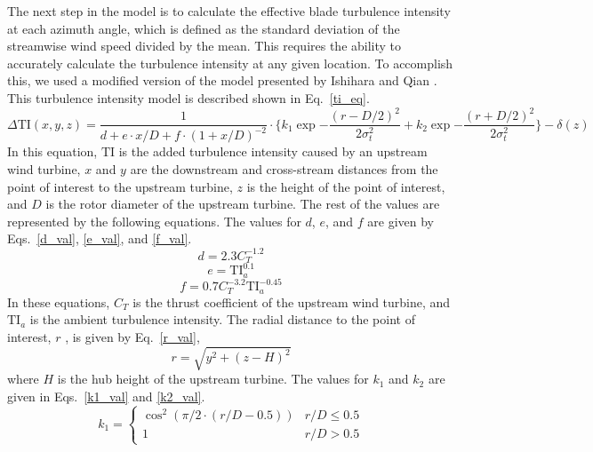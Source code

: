 \documentclass[11pt,letterpaper]{article}
\begin{document}
The next step in the model is to calculate the effective blade turbulence intensity at each azimuth angle, which is defined as the standard deviation of the streamwise wind speed divided by the mean. This requires the ability to accurately calculate the turbulence intensity at any given location. To accomplish this, we used a modified version of the model presented by Ishihara and Qian \cite{ishihara2018new}. This turbulence intensity model is described shown in Eq.~\ref{ti_eq}.
%
\begin{equation}
    \label{ti_eq}
    \Delta \text{TI}(x,y,z) = \frac{1}{d + e \cdot x/D + f\cdot(1+x/D)^{-2}} \cdot \Big\{k_1 \exp{-\frac{(r-D/2)^2}{2\sigma_t^2}} + k_2 \exp{-\frac{(r+D/2)^2}{2\sigma_t^2}} \Big\} - \delta(z)
\end{equation}
% 
In this equation, $\text{TI}$ is the added turbulence intensity caused by an upstream wind turbine, $x$ and $y$ are the downstream and cross-stream distances from the point of interest to the upstream turbine, $z$ is the height of the point of interest, and $D$ is the rotor diameter of the upstream turbine. The rest of the values are represented by the following equations. The values for $d$, $e$, and $f$ are given by Eqs.~\ref{d_val}, \ref{e_val}, and \ref{f_val}.
%
\begin{equation}
    \label{d_val}
    d = 2.3C_T^{-1.2}
\end{equation}
%
\begin{equation}
    \label{e_val}
    e = \text{TI}_a^{0.1}
\end{equation}
%
\begin{equation}
    \label{f_val}
    f = 0.7C_T^{-3.2} \text{TI}_a^{-0.45}
\end{equation}
In these equations, $C_T$ is the thrust coefficient of the upstream wind turbine, and $\text{TI}_a$ is the ambient turbulence intensity. The radial distance to the point of interest, $r$ , is given by Eq.~\ref{r_val},
%
\begin{equation}
    \label{r_val}
    r = \sqrt{y^2 + (z-H)^2}
\end{equation}
where $H$ is the hub height of the upstream turbine. The values for $k_1$ and $k_2$ are given in Eqs.~\ref{k1_val} and \ref{k2_val}.
%
\begin{equation}
    \label{k1_val}
    k_1 = \begin{cases} 
      \cos^2{(\pi/2 \cdot (r/D - 0.5))} & r/D \leq 0.5 \\
      1 & r/D > 0.5
   \end{cases}
\end{equation}
\end{document}
